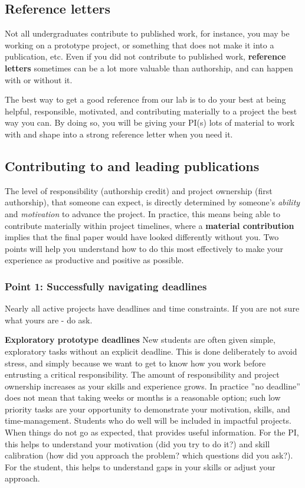 \documentclass[11pt, letterpaper]{article}
\begin{document}
\subsection{Reference letters}

Not all undergraduates contribute to published work, for instance, you may be working on a prototype project, or something that does not make it into a publication, etc. Even if you did not contribute to published work, \textbf{reference letters} sometimes can be a lot more valuable than authorship, and can happen with or without it. 

The best way to get a good reference from our lab is to do your best at being helpful, responsible, motivated, and contributing materially to a project the best way you can. By doing so, you will be giving your PI(s) lots of material to work with and shape into a strong reference letter when you need it.

\subsection{Contributing to and leading publications}

The level of responsibility (authorship credit) and project ownership (first authorship), that someone can expect, is directly determined by someone's \textit{ability} and \textit{motivation} to advance the project.
In practice, this means being able to contribute materially within project timelines, where a \textbf{material contribution} implies that the final paper would have looked differently without you. Two points will help you understand how to do this most effectively to make your experience as productive and positive as possible.

\subsubsection*{Point 1: Successfully navigating deadlines}

Nearly all active projects have deadlines and time constraints. If you are not sure what yours are - do ask.

\textbf{Exploratory prototype deadlines} New students are often given simple, exploratory tasks without an explicit deadline. This is done deliberately to avoid stress, and simply because we want to get to know how you work before entrusting a critical responsibility. The amount of responsibility and project ownership increases as your skills and experience grows. In practice ''no deadline'' does not mean that taking weeks or months is a reasonable option; such low priority tasks are your opportunity to demonstrate your motivation, skills, and time-management. Students who do well will be included in impactful projects. 
When things do not go as expected, that provides useful information.
For the PI, this helps to understand your motivation (did you try to do it?) and skill calibration (how did you approach the problem? which questions did you ask?). For the student, this helps to understand gaps in your skills or adjust your approach.
\end{document}
